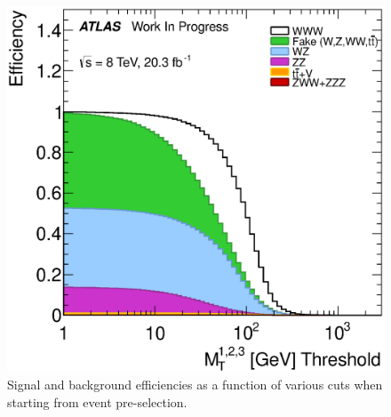 \begin{figure}[ht!]
\includegraphics[width=0.3\columnwidth]{figures/optimization/SignalRegions_0p5mmZ0_Preselection_Efficiencies/ThreeLeptonMt_Cumulative.eps}
\caption{Signal and background efficiencies as a function of various cuts when starting from event pre-selection.}
\label{fig:optimization_efficiencies_preselection}
\end{figure}




